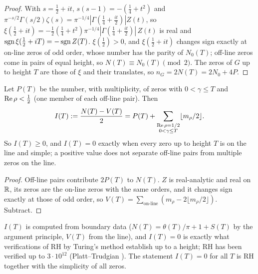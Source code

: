 \begin{proof}
With $s=\tfrac12+it$, $s(s-1)=-(\tfrac14+t^2)$ and $\pi^{-s/2}\Gamma(s/2)\zeta(s)=\pi^{-1/4}|\Gamma(\tfrac14+\tfrac{it}2)|Z(t)$, so $\xi(\tfrac12+it)=-\tfrac12(\tfrac14+t^2)\pi^{-1/4}|\Gamma(\tfrac14+\tfrac{it}2)|\,Z(t)$ is real and $\operatorname{sgn}\xi(\tfrac12+iT)=-\operatorname{sgn} Z(T)$.
$\xi(\tfrac12)>0$, and $\xi(\tfrac12+it)$ changes sign exactly at on-line zeros of odd order, whose number has the parity of $N_0(T)$; off-line zeros come in pairs of equal height, so $N(T)\equiv N_0(T)\pmod2$.
The zeros of $G$ up to height $T$ are those of $\xi$ and their translates, so $n_G=2N(T)=2N_0+4P$.
\end{proof}

\begin{proposition}\label{prop:index}
Let $P(T)$ be the number, with multiplicity, of zeros with $0<\gamma\le T$ and $\operatorname{Re}\rho<\tfrac12$ (one member of each off-line pair). Then
\[
I(T):=\frac{N(T)-V(T)}2=P(T)+\sum_{\substack{\operatorname{Re}\rho=1/2\\0<\gamma\le T}}\lfloor m_\rho/2\rfloor .
\]
So $I(T)\ge0$, and $I(T)=0$ exactly when every zero up to height $T$ is on the line and simple; a positive value does not separate off-line pairs from multiple zeros on the line.
\end{proposition}

\begin{proof}
Off-line pairs contribute $2P(T)$ to $N(T)$. $Z$ is real-analytic and real on $\mathbb{R}$, its zeros are the on-line zeros with the same orders, and it changes sign exactly at those of odd order, so $V(T)=\sum_{\text{on-line}}(m_\rho-2\lfloor m_\rho/2\rfloor)$. Subtract.
\end{proof}

$I(T)$ is computed from boundary data ($N(T)=\theta(T)/\pi+1+S(T)$ by the argument principle, $V(T)$ from the line), and $I(T)=0$ is exactly what verifications of RH by Turing's method \cite{Turing} establish up to a height; RH has been verified up to $3\cdot10^{12}$ (Platt--Trudgian \cite{PlattTrudgian}). The statement $I(T)=0$ for all $T$ is RH together with the simplicity of all zeros.

